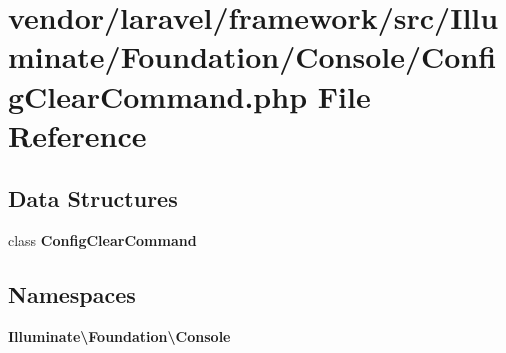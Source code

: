 \section{vendor/laravel/framework/src/\+Illuminate/\+Foundation/\+Console/\+Config\+Clear\+Command.php File Reference}
\label{_config_clear_command_8php}
\subsection*{Data Structures}
\begin{DoxyCompactItemize}
\item 
class {\bf Config\+Clear\+Command}
\end{DoxyCompactItemize}
\subsection*{Namespaces}
\begin{DoxyCompactItemize}
\item 
 {\bf Illuminate\textbackslash{}\+Foundation\textbackslash{}\+Console}
\end{DoxyCompactItemize}
